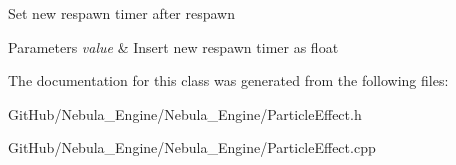 Set new respawn timer after respawn 
\begin{DoxyParams}{Parameters}
{\em value} & Insert new respawn timer as float \\
\hline
\end{DoxyParams}


The documentation for this class was generated from the following files\+:\begin{DoxyCompactItemize}
\item 
Git\+Hub/\+Nebula\+\_\+\+Engine/\+Nebula\+\_\+\+Engine/Particle\+Effect.\+h\item 
Git\+Hub/\+Nebula\+\_\+\+Engine/\+Nebula\+\_\+\+Engine/Particle\+Effect.\+cpp\end{DoxyCompactItemize}
